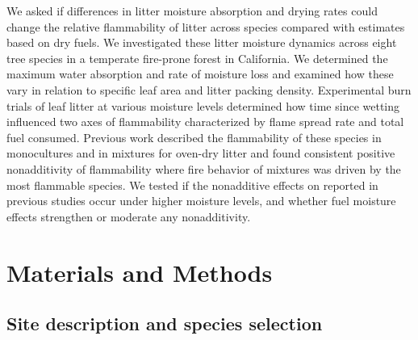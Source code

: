 \documentclass[letterpaper,12pt]{article}
\begin{document}
We asked if differences in litter moisture absorption and drying rates could
change the relative flammability of litter across species compared with
estimates based on dry fuels. We investigated these litter moisture dynamics
across eight tree species in a temperate fire-prone forest in California. We
determined the maximum water absorption and rate of moisture loss and examined
how these vary in relation to specific leaf area and litter packing density.
Experimental burn trials of leaf litter at various moisture levels determined
how time since wetting influenced two axes of flammability characterized by
flame spread rate and total fuel consumed. Previous work described the
flammability of these species in monocultures and in mixtures for oven-dry
litter \citep{Magalhaes+Schwilk-2012} and found consistent positive
nonadditivity of flammability where fire behavior of mixtures was driven by the
most flammable species. We tested if the nonadditive effects on reported in
previous studies occur under higher moisture levels, and whether fuel moisture
effects strengthen or moderate any nonadditivity.


\section*{Materials and Methods}

\subsection*{Site description and species selection}
\end{document}
